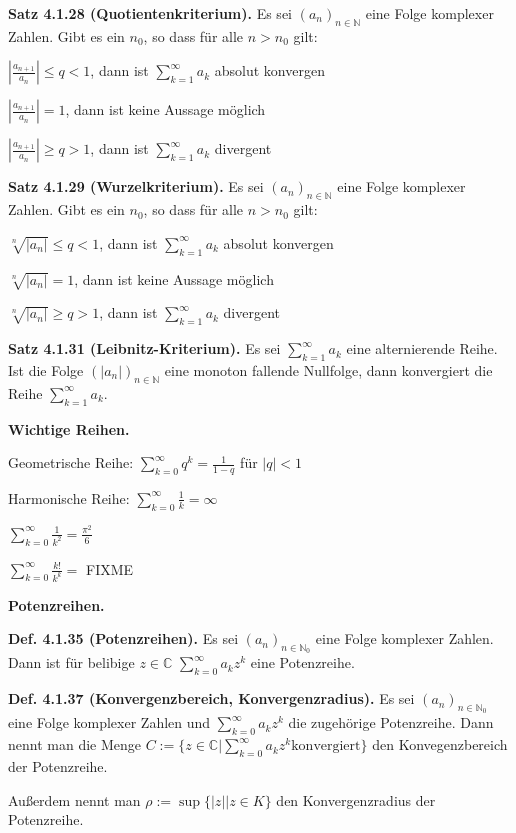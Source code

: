 \documentclass[ngerman]{article}
\begin{document}
\begin{multicols}{4}
\begin{tiny}
\textbf{Satz 4.1.28 (Quotientenkriterium).} Es sei $(a_n)_{n\in \mathbb N}$ eine Folge komplexer Zahlen. Gibt es ein $n_0$, so dass für alle $n>n_0$ gilt:

$\left|\frac{a_{n+1}}{a_n}\right| \le q<1$, dann ist $\sum_{k=1}^\infty a_k$ absolut konvergen

$\left|\frac{a_{n+1}}{a_n}\right| = 1$, dann ist keine Aussage möglich

$\left|\frac{a_{n+1}}{a_n}\right| \ge q > 1$, dann ist $\sum_{k=1}^\infty a_k$ divergent

\textbf{Satz 4.1.29 (Wurzelkriterium).} Es sei $(a_n)_{n\in \mathbb N}$ eine Folge komplexer Zahlen. Gibt es ein $n_0$, so dass für alle $n>n_0$ gilt:

$\sqrt[n]{\vert a_n \vert} \le q<1$, dann ist $\sum_{k=1}^\infty a_k$ absolut konvergen

$\sqrt[n]{\vert a_n \vert} = 1$, dann ist keine Aussage möglich

$\sqrt[n]{\vert a_n \vert} \ge q > 1$, dann ist $\sum_{k=1}^\infty a_k$ divergent

\textbf{Satz 4.1.31 (Leibnitz-Kriterium).} Es sei $\sum_{k=1}^\infty a_k$ eine alternierende Reihe. Ist die Folge $(\vert a_n \vert )_{n \in \mathbb N}$ eine monoton fallende Nullfolge, dann konvergiert die Reihe $\sum_{k=1}^\infty a_k$.

\textbf{Wichtige Reihen.}

Geometrische Reihe: $\sum_{k=0}^\infty q^k = \frac{1}{1-q}$ für $\vert q \vert < 1$

Harmonische Reihe: $\sum_{k=0}^\infty \frac{1}{k} = \infty$

$\sum_{k=0}^\infty \frac{1}{k^2} = \frac{\pi^2}{6}$

$\sum_{k=0}^\infty \frac{k!}{k^k} =$ FIXME

\textbf{Potenzreihen.}

\textbf{Def. 4.1.35 (Potenzreihen).} Es sei $(a_n)_{n \in \mathbb N_0}$ eine Folge komplexer Zahlen. Dann ist für belibige $z \in \mathbb C$ $\sum_{k=0}^\infty a_k z^k$ eine Potenzreihe.

\textbf{Def. 4.1.37 (Konvergenzbereich, Konvergenzradius).} Es sei $(a_n)_{n\in \mathbb N_0}$ eine Folge komplexer Zahlen und $\sum_{k=0}^\infty a_k z^k$ die zugehörige Potenzreihe. Dann nennt man die Menge $C := \{ z \in \mathbb C \vert \sum_{k=0}^\infty a_k z^k \text{konvergiert}\}$ den Konvegenzbereich der Potenzreihe.

Außerdem nennt man $\rho := \sup \{ \vert z\vert \vert z \in K\}$ den Konvergenzradius der Potenzreihe.


\end{tiny}
\end{multicols}
\end{document}
